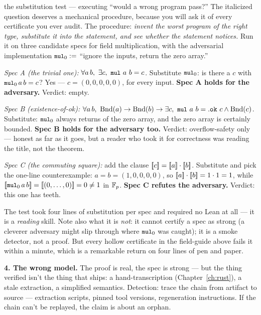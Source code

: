 \begin{worked}{the substitution test --- executing ``would a wrong program pass?''}
The italicized question deserves a mechanical procedure, because you will
ask it of every certificate you ever audit. The procedure: \emph{invent
the worst program of the right type, substitute it into the statement,
and see whether the statement notices.} Run it on three candidate specs
for field multiplication, with the adversarial implementation
$\code{mul}_0 :=$ ``ignore the inputs, return the zero array.''

\emph{Spec A (the trivial one):}
$\forall a\, b,\ \exists c,\ \code{mul}\ a\ b = c$. Substitute
$\code{mul}_0$: is there a $c$ with $\code{mul}_0\,a\,b = c$? Yes ---
$c = (0,0,0,0,0)$, for every input. \textbf{Spec A holds for the
adversary.} Verdict: empty.

\emph{Spec B (existence-of-ok):}
$\forall a\, b,\ \mathrm{Bnd}(a) \to \mathrm{Bnd}(b) \to
\exists c,\ \code{mul}\ a\ b = \mathtt{.ok}\ c \wedge \mathrm{Bnd}(c)$.
Substitute: $\code{mul}_0$ always returns  of the zero array,
and the zero array is certainly bounded. \textbf{Spec B holds for the
adversary too.} Verdict: overflow-safety only --- honest as far as it
goes, but a reader who took it for correctness was reading the title,
not the theorem.

\emph{Spec C (the commuting square):} add the clause
$[\mkern-3.3mu[ c ]\mkern-3.3mu] = [\mkern-3.3mu[ a ]\mkern-3.3mu] \cdot [\mkern-3.3mu[ b ]\mkern-3.3mu]$. Substitute and pick the
one-line counterexample: $a = b = (1,0,0,0,0)$, so
$[\mkern-3.3mu[ a ]\mkern-3.3mu] \cdot [\mkern-3.3mu[ b ]\mkern-3.3mu] = 1 \cdot 1 = 1$, while
$\denote{\code{mul}_0\,a\,b} = \denote{(0,\dots,0)} = 0 \neq 1$ in
$\mathbb{F}_p$. \textbf{Spec C refutes the adversary.} Verdict: this one has
teeth.

The test took four lines of substitution per spec and required no Lean at
all --- it is a \emph{reading} skill. Note also what it is \emph{not}: it
cannot certify a spec as strong (a cleverer adversary might slip through
where $\code{mul}_0$ was caught); it is a smoke detector, not a proof.
But every hollow certificate in the field-guide above fails it within a
minute, which is a remarkable return on four lines of pen and paper.
\end{worked}

\textbf{4. The wrong model.} The proof is real, the spec is strong --- but
the thing verified isn't the thing that ships: a hand-transcription
(Chapter~\ref{ch:rust}), a stale extraction, a simplified semantics.
Detection: trace the chain from artifact to source --- extraction scripts,
pinned tool versions, regeneration instructions. If the chain can't be
replayed, the claim is about an orphan.

